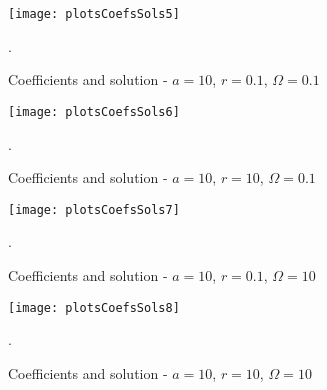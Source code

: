 \documentclass[12pt,twoside]{article}
\begin{document}
\begin{figure} 
\begin{center}
\texttt{[image: plotsCoefsSols5]}
\end{center}
\caption {Coefficients and solution - $a = 10$, $r = 0.1$, $\Omega = 0.1$}.

\label{fig:atanCoefsPlots5}
\end{figure}

\begin{figure} 
\begin{center}
\texttt{[image: plotsCoefsSols6]}
\end{center}
\caption {Coefficients and solution - $a = 10$, $r = 10$, $\Omega = 0.1$}.

\label{fig:atanCoefsPlots6}
\end{figure}

\begin{figure} 
\begin{center}
\texttt{[image: plotsCoefsSols7]}
\end{center}
\caption {Coefficients and solution - $a = 10$, $r = 0.1$, $\Omega = 10$}.

\label{fig:atanCoefsPlots7}
\end{figure}

\begin{figure} 
\begin{center}
\texttt{[image: plotsCoefsSols8]}
\end{center}
\caption {Coefficients and solution - $a = 10$, $r = 10$, $\Omega = 10$}.

\label{fig:atanCoefsPlots8}
\end{figure}
\end{document}
